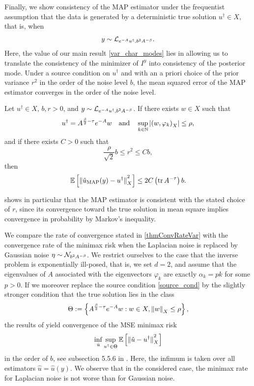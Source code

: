 \documentclass[english]{jnsao}
\theoremstyle{definition}
\begin{document}
Finally, we show consistency of the MAP estimator under the frequentist assumption that the data is generated by a deterministic true solution $u^\dagger \in X$, that is, when
\[ y \sim \mathcal{L}_{e^{-A}u^\dagger, b^2 A^{-\beta}}. \]
Here, the value of our main result \cref{var_char_modes} lies in allowing us to translate the consistency of the minimizer of $I^y$ into consistency of the posterior mode.
Under a source condition on $u^\dagger$ and with an a priori choice of the prior variance $r^2$ in the order of the noise level $b$, the mean squared error of the MAP estimator converges in the order of the noise level.

\begin{theorem} 
	\label{thmConvRateVar}
	Let $u^\dagger \in X$, $b, r > 0$, and $y \sim \mathcal{L}_{e^{-A}u^\dagger, b^2 A^{-\beta}}$. 
	If there exists $w \in X$ such that
	\begin{equation}
		\label{source_cond}
		u^\dagger = A^{\frac{\beta}{2} - \tau}e^{-A}w 
		\quad \text{and} \quad \sup_{k\in\mathbb{N}} {\lvert{(w,\varphi_k)}_X\rvert} \le \rho,
	\end{equation}
	and if there exists $C > 0$ such that
		\[ \frac{\rho}{\sqrt{2}} b \le r^2 \le C b, \]
	then 
		\[ \mathbb{E}\left[ {\lVert\hat{u}_\mathrm{MAP}(y) - u^\dagger\rVert}_{X}^2 \right] \le 2C \left(\operatorname{tr} A^{-\tau}\right) b. \]
\end{theorem}

 shows in particular that the MAP estimator is consistent with the stated choice of $r$, since its convergence toward the true solution in mean square implies convergence in probability by Markov's inequality.

We compare the rate of convergence stated in \cref{thmConvRateVar} with the convergence rate of the minimax risk when the Laplacian noise is replaced by Gaussian noise $\eta \sim \mathcal{N}_{b^2 A^{-\beta}}$. We restrict ourselves to the case that the inverse problem is exponentially ill-posed, that is, we set $d = 2$, and assume that the eigenvalues of $A$ associated with the eigenvectors $\varphi_k$ are exactly $\alpha_k = pk$ for some $p > 0$. If we moreover replace the source condition \eqref{source_cond} by the slightly stronger condition that the true solution lies in the class
\[ \Theta := \left\{ A^{\frac{\beta}{2} - \tau}e^{-A}w: w \in X, {\lVert w\rVert}_X \le \rho \right\}, \]
the results of \cite{DingMathe:2017} yield convergence of the MSE minimax risk
\[ \inf_{\hat{u}} \sup_{u^\dagger \in \Theta} \mathbb{E}\left[{\lVert\hat{u} - u^\dagger\rVert}_X^2\right] \]
in the order of $b$, see subsection 5.5.6 in \cite{Kretschmann:2019}. Here, the infimum is taken over all estimators $\hat{u} = \hat{u}(y)$.
We observe that in the considered case, the minimax rate for Laplacian noise is not worse than for Gaussian noise.
\end{document}
